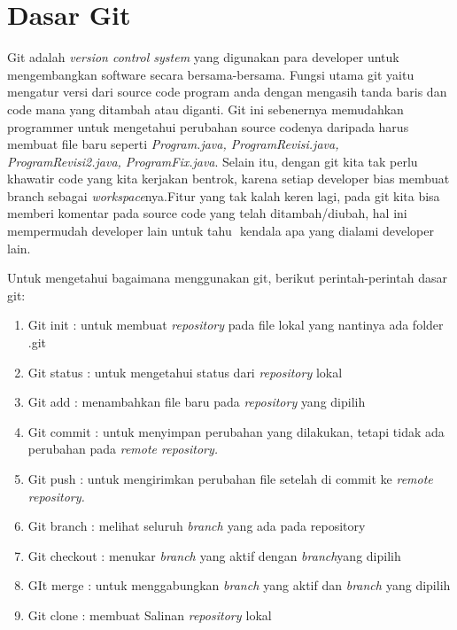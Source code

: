 
\section{Dasar Git} 
\noindent 
 \hspace*{0.5in} Git adalah $  $\textit{version control system} $  $yang digunakan para developer untuk mengembangkan software secara bersama-bersama. Fungsi utama git yaitu mengatur versi dari source code program anda dengan mengasih tanda baris dan code mana yang ditambah atau diganti. Git ini sebenernya memudahkan programmer untuk mengetahui perubahan source codenya daripada harus membuat file baru seperti $  $\textit{Program.java, ProgramRevisi.java, }\textit{ProgramRevisi2.java, ProgramFix.java}. Selain itu, dengan git kita tak perlu khawatir code yang kita kerjakan bentrok, karena setiap developer bias membuat branch sebagai $  $\textit{workspace}nya.Fitur yang tak kalah keren lagi, pada git kita bisa memberi komentar pada source code yang telah ditambah/diubah, hal ini mempermudah developer lain untuk tahu $  $ kendala apa yang dialami developer lain. \par
\noindent 
Untuk mengetahui bagaimana menggunakan git, berikut perintah-perintah dasar git: \par
\noindent 
\begin{enumerate}
\item Git init : untuk membuat $  $\textit{repository} $  $pada file lokal yang nantinya ada folder .git \par
\noindent 
\item Git status : untuk mengetahui status dari $  $\textit{repository} $  $lokal \par
\noindent 
\item Git add : menambahkan file baru pada $  $\textit{repository} $  $yang dipilih \par
\noindent 
\item Git commit : untuk menyimpan perubahan yang dilakukan, tetapi tidak ada perubahan pada $  $\textit{remote repository.} \par
\noindent 
\item Git push : untuk mengirimkan perubahan file setelah di commit ke $  $\textit{remote repository.} \par
\noindent 
\item Git branch : melihat seluruh $  $\textit{branch $  $}yang ada pada repository \par
\noindent 
\item Git checkout : menukar $  $\textit{branch $  $}yang aktif dengan $  $\textit{branch}yang dipilih \par
\noindent 
\item GIt merge : untuk menggabungkan $  $\textit{branch $  $}yang aktif dan $  $\textit{branch $  $}yang dipilih \par
\noindent 
\item Git clone : membuat Salinan $  $\textit{repository $  $}lokal\end{enumerate}
